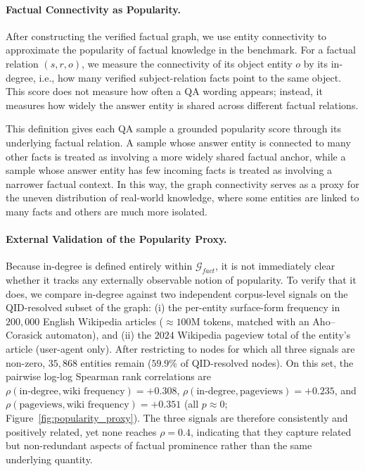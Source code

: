 \paragraph{Factual Connectivity as Popularity.}
After constructing the verified factual graph, we use entity connectivity to approximate the popularity of factual knowledge in the benchmark. For a factual relation $(s,r,o)$, we measure the connectivity of its object entity $o$ by its in-degree, i.e., how many verified subject-relation facts point to the same object. This score does not measure how often a QA wording appears; instead, it measures how widely the answer entity is shared across different factual relations.

This definition gives each QA sample a grounded popularity score through its underlying factual relation. A sample whose answer entity is connected to many other facts is treated as involving a more widely shared factual anchor, while a sample whose answer entity has few incoming facts is treated as involving a narrower factual context. In this way, the graph connectivity serves as a proxy for the uneven distribution of real-world knowledge, where some entities are linked to many facts and others are much more isolated.

\paragraph{External Validation of the Popularity Proxy.}
Because in-degree is defined entirely within $\mathcal{G}_{fact}$, it is not immediately clear whether it tracks any externally observable notion of popularity. To verify that it does, we compare in-degree against two independent corpus-level signals on the QID-resolved subset of the graph: (i) the per-entity surface-form frequency in $200{,}000$ English Wikipedia articles ($\approx 100$M tokens, matched with an Aho--Corasick automaton), and (ii) the $2024$ Wikipedia pageview total of the entity's article (user-agent only). After restricting to nodes for which all three signals are non-zero, $35{,}868$ entities remain ($59.9\%$ of QID-resolved nodes). On this set, the pairwise log-log Spearman rank correlations are $\rho(\text{in-degree}, \text{wiki frequency}) = +0.308$, $\rho(\text{in-degree}, \text{pageviews}) = +0.235$, and $\rho(\text{pageviews}, \text{wiki frequency}) = +0.351$ (all $p \approx 0$; Figure~\ref{fig:popularity_proxy}). The three signals are therefore consistently and positively related, yet none reaches $\rho = 0.4$, indicating that they capture related but non-redundant aspects of factual prominence rather than the same underlying quantity.

